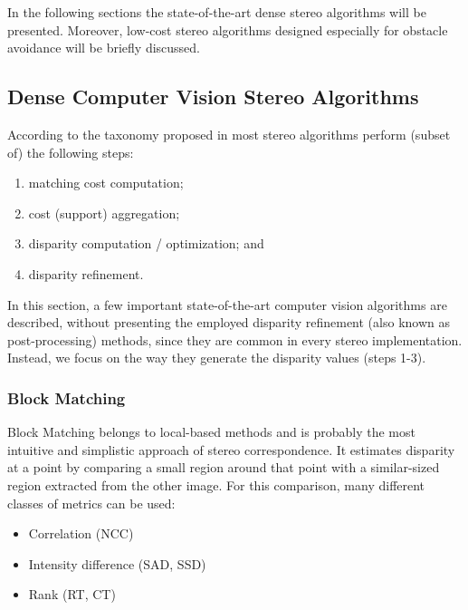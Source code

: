 In the following sections the state-of-the-art dense stereo algorithms will be presented. Moreover, low-cost stereo algorithms designed especially for obstacle avoidance will be briefly discussed.

\subsection{Dense Computer Vision Stereo Algorithms}

According to the taxonomy proposed in \cite{Scharstein2002} most stereo algorithms perform (subset of) the following steps:

\begin{enumerate}
	\item matching cost computation;
	\item cost (support) aggregation;
	\item disparity computation / optimization; and
	\item disparity refinement.
\end{enumerate}


In this section, a few important state-of-the-art computer vision algorithms are described, without presenting the employed disparity refinement (also known as post-processing) methods, since they are common in every stereo implementation. Instead, we focus on the way they generate the disparity values (steps 1-3).

\subsubsection{Block Matching}

Block Matching belongs to local-based methods and is probably the most intuitive and simplistic approach of stereo correspondence. It estimates disparity at a point by comparing a small region around that point with a similar-sized region extracted from the other image. For this comparison, many different classes of metrics can be used:

\begin{itemize}
	\item Correlation (\acs{NCC})
	\item Intensity difference (\acs{SAD}, \acs{SSD})
	\item Rank (\acs{RT}, \acs{CT})
\end{itemize}

